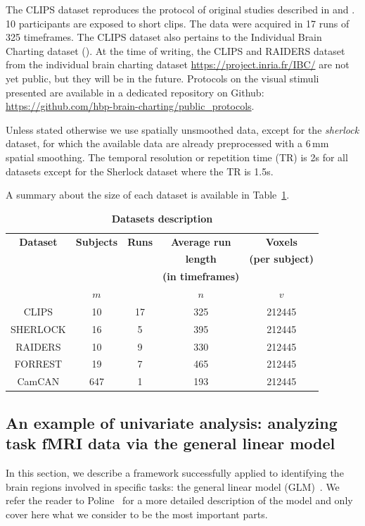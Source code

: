 The CLIPS dataset reproduces the protocol of original studies described in
\cite{nishimoto2011reconstructing} and \cite{huth2012continuous}. 10
participants are exposed to short clips. The data were acquired in 17 runs of 325 timeframes. 
%
The CLIPS dataset also pertains to the Individual Brain Charting dataset
(\cite{ibc}).
%
At the time of writing, the CLIPS and RAIDERS dataset from the individual brain charting dataset \url{https://project.inria.fr/IBC/} are not yet public, but they will be in the future. Protocols on the visual stimuli presented are available in a dedicated repository on Github: \url{https://github.com/hbp-brain-charting/public_protocols}.

Unless stated otherwise we use spatially unsmoothed data, except for the
\emph{sherlock} dataset, for which the available data are already preprocessed
with a 6\,mm spatial smoothing. The temporal resolution or repetition time (TR) is 2s for all datasets except for the Sherlock dataset where the TR is 1.5s.
%

A summary about the size of each dataset is available in Table~\ref{tab:dataset_desc2}.
\begin{table}
	\begin{tabular}{|c|c|c|c|c|}
		\hline
		\textbf{Dataset} & \textbf{Subjects} & \textbf{Runs} & \textbf{Average run} & \textbf{Voxels} \\
                     && & \textbf{length} & \textbf{(per subject)} \\
                     && & \textbf{(in timeframes)} &  \\
                     &$m$& $ $ & $n$ &$v$  \\
		\hline
		CLIPS & 10 & 17 & 325 & 212445\\ 
		\hline
		SHERLOCK & 16 & 5 & 395 & 212445 \\ 
		\hline
		RAIDERS & 10 & 9 & 330 & 212445 \\
		\hline 
		FORREST & 19 & 7 & 465 & 212445\\
		\hline
		CamCAN & 647 & 1 & 193 & 212445 \\
		\hline
	\end{tabular}
  \caption{\textbf{Datasets description}}
  \label{tab:dataset_desc2}
\end{table}

\subsection{An example of univariate analysis: analyzing task fMRI data via the general linear model}
In this section, we describe a framework successfully applied to identifying the brain regions involved in specific tasks: the general linear model
(GLM)~\cite{friston1995analysis}. We refer the reader to
Poline~\cite{poline2012general} for a more detailed description of the model and only cover here what we consider to be the most important parts.

